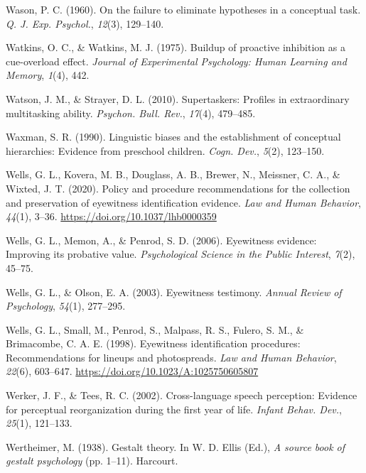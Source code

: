 \documentclass[
]{krantz}
\newlength{\cslhangindent}
\newenvironment{CSLReferences}[2] %
 {\begin{list}{}{%
  \setlength{\itemindent}{0pt}
  \setlength{\leftmargin}{0pt}
  \setlength{\parsep}{0pt}
  \ifodd #1
   \setlength{\leftmargin}{\cslhangindent}
   \setlength{\itemindent}{-1\cslhangindent}
  \fi
  \setlength{\itemsep}{#2\baselineskip}}}
 {\end{list}}
\begin{document}
\begin{CSLReferences}{1}{0}
Wason, P. C. (1960). On the failure to eliminate hypotheses in a conceptual task. \emph{Q. J. Exp. Psychol.}, \emph{12}(3), 129--140.

Watkins, O. C., \& Watkins, M. J. (1975). Buildup of proactive inhibition as a cue-overload effect. \emph{Journal of Experimental Psychology: Human Learning and Memory}, \emph{1}(4), 442.

Watson, J. M., \& Strayer, D. L. (2010). Supertaskers: Profiles in extraordinary multitasking ability. \emph{Psychon. Bull. Rev.}, \emph{17}(4), 479--485.

Waxman, S. R. (1990). Linguistic biases and the establishment of conceptual hierarchies: Evidence from preschool children. \emph{Cogn. Dev.}, \emph{5}(2), 123--150.

Wells, G. L., Kovera, M. B., Douglass, A. B., Brewer, N., Meissner, C. A., \& Wixted, J. T. (2020). Policy and procedure recommendations for the collection and preservation of eyewitness identification evidence. \emph{Law and Human Behavior}, \emph{44}(1), 3--36. \url{https://doi.org/10.1037/lhb0000359}

Wells, G. L., Memon, A., \& Penrod, S. D. (2006). Eyewitness evidence: Improving its probative value. \emph{Psychological Science in the Public Interest}, \emph{7}(2), 45--75.

Wells, G. L., \& Olson, E. A. (2003). Eyewitness testimony. \emph{Annual Review of Psychology}, \emph{54}(1), 277--295.

Wells, G. L., Small, M., Penrod, S., Malpass, R. S., Fulero, S. M., \& Brimacombe, C. A. E. (1998). Eyewitness identification procedures: Recommendations for lineups and photospreads. \emph{Law and Human Behavior}, \emph{22}(6), 603--647. \url{https://doi.org/10.1023/A:1025750605807}

Werker, J. F., \& Tees, R. C. (2002). Cross-language speech perception: Evidence for perceptual reorganization during the first year of life. \emph{Infant Behav. Dev.}, \emph{25}(1), 121--133.

Wertheimer, M. (1938). Gestalt theory. In W. D. Ellis (Ed.), \emph{A source book of gestalt psychology} (pp. 1--11). Harcourt.


\end{CSLReferences}
\end{document}
